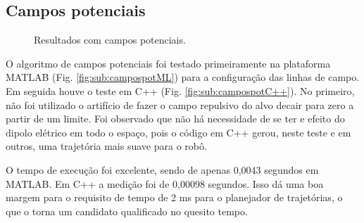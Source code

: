 \documentclass[a4paper,12pt]{article}
\begin{document}
   
   
\subsection{Campos potenciais}

\begin{figure}
\caption{Resultados com campos potenciais.}
\end{figure}
    
O algoritmo de campos potenciais foi testado primeiramente na plataforma MATLAB (Fig. \ref{fig:sub:campospotML}) para a configuração das linhas de campo. Em seguida houve o teste em C++ (Fig. \ref{fig:sub:campospotC++}). No primeiro, não foi utilizado o artifício de fazer o campo repulsivo do alvo decair para zero a partir de um limite. Foi observado que não há necessidade de se ter e efeito do dipolo elétrico em todo o espaço, pois o código em C++ gerou, neste teste e em outros, uma trajetória mais suave para o robô.

O tempo de execução foi excelente, sendo de apenas 0,0043 segundos em MATLAB. Em C++ a medição foi de 0,00098 segundos. Isso dá uma boa margem para o requisito de tempo de 2 ms para o planejador de trajetórias, o que o torna um candidato qualificado no quesito tempo.
    
\end{document}
